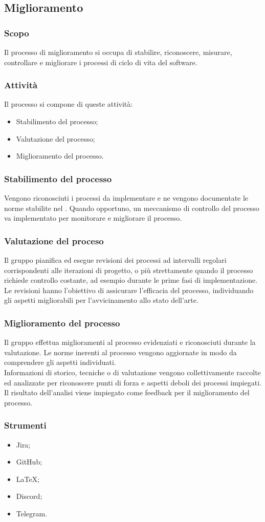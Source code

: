 \subsection{Miglioramento}
\subsubsection{Scopo}
Il processo di miglioramento si occupa di stabilire, riconoscere, misurare, controllare e migliorare i processi di ciclo di vita del software.

\subsubsection{Attività}
Il processo si compone di queste attività:
\begin{itemize}
  \item Stabilimento del processo;
  \item Valutazione del processo;
  \item Miglioramento del processo.
\end{itemize}

\subsubsection{Stabilimento del processo}
Vengono riconosciuti i processi da implementare e ne vengono documentate le norme stabilite nel \WoW. Quando opportuno, un meccanismo di controllo del processo va implementato per monitorare e migliorare il processo.

\subsubsection{Valutazione del proceso}
Il gruppo pianifica ed esegue revisioni dei processi ad intervalli regolari corrispondenti alle iterazioni di progetto, o più strettamente quando il processo richiede controllo costante, ad esempio durante le prime fasi di implementazione.\\
Le revisioni hanno l'obiettivo di assicurare l'efficacia del processo, individuando gli aspetti migliorabili per l'avvicinamento allo stato dell'arte.

\subsubsection{Miglioramento del processo}
Il gruppo effettua miglioramenti al processo evidenziati e riconosciuti durante la valutazione. Le norme inerenti al processo vengono aggiornate in modo da comprendere gli aspetti individuati.\\
Informazioni di storico, tecniche o di valutazione vengono collettivamente raccolte ed analizzate per riconoscere punti di forza e aspetti deboli dei processi impiegati. Il risultato dell'analisi viene impiegato come feedback per il miglioramento del processo.

\subsubsection{Strumenti}
\begin{itemize}
  \item Jira;
  \item GitHub;
  \item LaTeX;
  \item Discord;
  \item Telegram.
\end{itemize}
